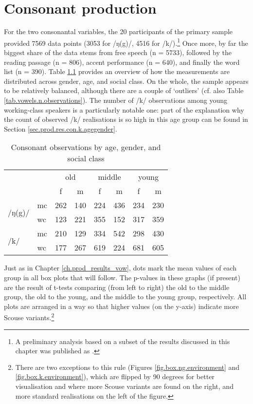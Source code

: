 \chapter{Consonant production}
\label{prod.res.con}

For the two consonantal variables, the 20 participants of the primary sample provided 7569 data points (3053 for /ŋ(g)/, 4516 for /k/).\footnote{A preliminary analysis based on a subset of the results discussed in this chapter was published as \citealt{juskanaccentrevivallipp}.}
Once more, by far the biggest share of the data stems from free speech (n = 5733), followed by the reading passage (n = 806), accent performance (n = 640), and finally the word list (n = 390).
Table \ref{tab.consonants.n.observations} provides an overview of how the measurements are distributed across gender, age, and social class.
On the whole, the sample appears to be relatively balanced, although there are a couple of `outliers' (cf. also Table \ref{tab.vowels.n.observations}).
The number of /k/ observations among young working-class speakers is a particularly notable one: part of the explanation why the count of observed /k/ realisations is so high in this age group can be found in Section \ref{sec.prod.res.con.k.agegender}.

\begin{table}[h!]
	\centering
	\caption{Consonant observations by age, gender, and social class}
	\label{tab.consonants.n.observations}
	\begin{tabular}{llcccccc}
		\hline
		\multicolumn{2}{c}{} & \multicolumn{2}{c}{old} & \multicolumn{2}{c}{middle} & \multicolumn{2}{c}{young}\\
		& & f & m & f & m & f & m\\
		\hline
		\multirow{2}{*}{/ŋ(g)/} & mc & 262 & 140 & 224 & 436 & 234 & 230\\
		& wc & 123 & 221 & 355 & 152 & 317 & 359\\
		\multirow{2}{*}{/k/} & mc & 210 & 129 & 334 & 542 & 298 & 430\\
		& wc & 177 & 267 & 619 & 224 & 681 & 605\\
		\hline
	\end{tabular}
\end{table}

Just as in Chapter \ref{ch.prod_results_vow}, dots mark the mean values of each group in all box plots that will follow.
The p-values in these graphs (if present) are the result of t-tests comparing (from left to right) the old to the middle group, the old to the young, and the middle to the young group, respectively.
All plots are arranged in a way so that higher values (on the y-axis) indicate more Scouse variants.\footnote{There are two exceptions to this rule (Figures \ref{fig.box.ng.environment} and \ref{fig.box.k.environment}), which are flipped by 90 degrees for better visualisation and where more Scouse variants are found on the right, and more standard realisations on the left of the figure.}


